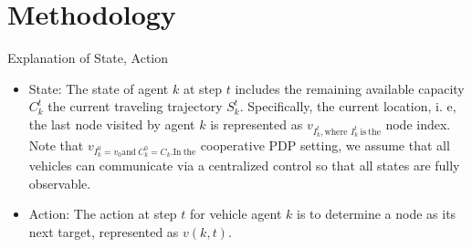 \documentclass{beamer}
\begin{document}


\section{Methodology}

\begin{frame}{Explanation of State, Action}
	\begin{itemize}
		\item State: The state of agent $k$ at step $t$ includes the remaining available capacity $C_k^t$ the current traveling trajectory $S_{k}^{t}.$ Specifically, the current location, i. e, the last node visited by agent $k$ is represented as $v_{I_{k}^{t}, \text{where }I_{k}^{t}\mathrm{~is~the}}$ node index. Note that $v_{I_{k}^{0}= v_{0} \mathrm{and~}C_{k}^{0}= C_{k}. \mathrm{In~the}}$ cooperative PDP setting, we assume that all vehicles can communicate via a centralized control so that all states are fully observable.
		\item Action: The action at step $t$ for vehicle agent $k$ is to determine a node as its next target, represented as $v(k,t).$
	\end{itemize}
\end{frame}
\end{document}
